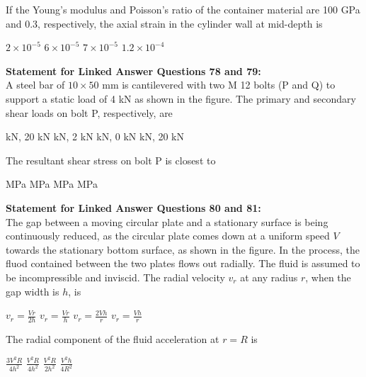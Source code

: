 \documentclass[addpoints,11pt]{exam}
\begin{document}
\begin{questions}
    \question If the Young's modulus and Poisson's ratio of the container material are 100 GPa and 0.3, respectively, the axial strain in the cylinder wall at mid-depth is

    \begin{oneparchoices}
        \choice $2\times10^{-5}$
        \choice $6\times10^{-5}$
        \choice $7\times10^{-5}$
        \choice $1.2\times10^{-4}$
    \end{oneparchoices}

\normalsize\textbf{Statement for Linked Answer Questions 78 and 79:}\\
A steel bar of $10\times50$ mm is cantilevered with two M 12 bolts (P and Q) to support a static load of 4 kN as shown in the figure.%
    \question The primary and secondary shear loads on bolt P, respectively, are

    \begin{oneparchoices}
         kN, 20 kN
         kN, 2 kN
         kN, 0 kN
         kN, 20 kN
    \end{oneparchoices}

    \question The resultant shear stress on bolt P is closest to

    \begin{oneparchoices}
         MPa
         MPa
         MPa
         MPa
    \end{oneparchoices}

\normalsize\textbf{Statement for Linked Answer Questions 80 and 81:}\\
The gap between a moving circular plate and a stationary surface is being continuously reduced, as the circular plate comes down at a uniform speed $V$ towards the stationary bottom surface, as shown in the figure. In the process, the fluod contained between the two plates flows out radially. The fluid is assumed to be incompressible and inviscid.%
    \question The radial velocity $v_r$ at any radius $r$, when the gap width is $h$, is

    \begin{oneparchoices}
        \choice $v_r = \frac{Vr}{2h}$
        \choice $v_r = \frac{Vr}{h}$
        \choice $v_r = \frac{2Vh}{r}$
        \choice $v_r = \frac{Vh}{r}$
    \end{oneparchoices}

    \question The radial component of the fluid acceleration at $r=R$ is
    
    \begin{oneparchoices}
        \choice $\frac{3V^2R}{4h^2}$
        \choice $\frac{V^2R}{4h^2}$
        \choice $\frac{V^2R}{2h^2}$
        \choice $\frac{V^2h}{4R^2}$
    \end{oneparchoices}
    

\end{questions}
\end{document}
